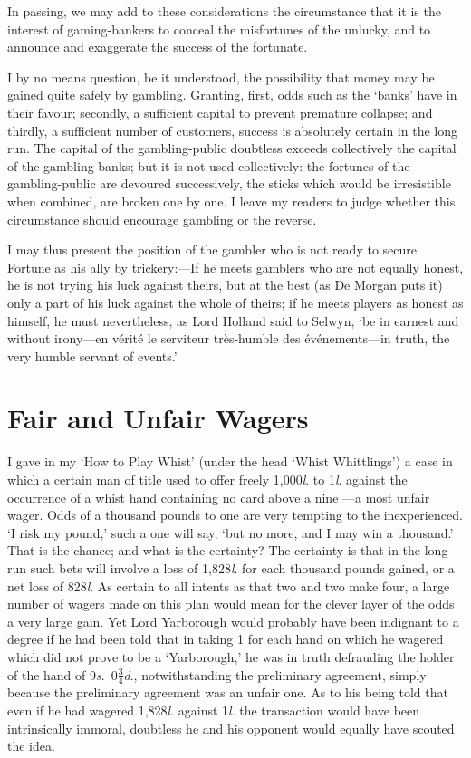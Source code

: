 \documentclass[letterpaper,12pt,oneside,openany]{memoir}
\begin{document}
In passing, we may add to these considerations the
circumstance that it is the interest of gaming-bankers
to conceal the misfortunes of the unlucky, and to
announce and exaggerate the success of the fortunate.

I by no means question, be it understood, the
possibility that money may be gained quite safely by
gambling. Granting, first, odds such as the `banks'
have in their favour; secondly, a sufficient capital to
prevent premature collapse; and thirdly, a sufficient
number of customers, success is absolutely certain in
the long run. The capital of the gambling-public doubtless
exceeds collectively the capital of the gambling-banks;
but it is not used collectively: the fortunes of
the gambling-public are devoured successively, the
sticks which would be irresistible when combined, are
broken one by one. I leave my readers to judge
whether this circumstance should encourage gambling
or the reverse.

I may thus present the position of the gambler
who is not ready to secure Fortune as his ally by
trickery:---If he meets gamblers who are not equally
honest, he is not trying his luck against theirs, but
at the best (as De Morgan puts it) only a part of his
luck against the whole of theirs; if he meets players
as honest as himself, he must nevertheless, as Lord
Holland said to Selwyn, `be in earnest and without
irony---en v\'erit\'e le serviteur tr\`es-humble des \'ev\'enements---in
truth, the very humble servant of events.'

\chapter{Fair and Unfair Wagers}

I gave in my `How to Play Whist' (under the head
`Whist Whittlings') a case in which a certain man of
title used to offer freely 1,000\textit{l}. to 1\textit{l}. against the occurrence
of a whist hand containing no card above a nine
---a most unfair wager. Odds of a thousand pounds
to one are very tempting to the inexperienced. `I risk
my pound,' such a one will say, `but no more, and I
may win a thousand.' That is the chance; and what
is the certainty? The certainty is that in the long
run such bets will involve a loss of 1,828\textit{l}. for each
thousand pounds gained, or a net loss of 828\textit{l}. As
certain to all intents as that two and two make four,
a large number of wagers made on this plan would
mean for the clever layer of the odds a very large
gain. Yet Lord Yarborough would probably have
been indignant to a degree if he had been told that in
taking 1 for each hand on which he wagered which
did not prove to be a `Yarborough,' he was in truth
defrauding the holder of the hand
of 9\textit{s}.\ $0\frac{3}{4}$\textit{d}.,
notwithstanding the preliminary agreement, simply because
the preliminary agreement was an unfair one. As to
his being told that even if he had wagered 1,828\textit{l}.
against 1\textit{l}. the transaction would have been intrinsically
immoral, doubtless he and his opponent would equally
have scouted the idea.
\end{document}
